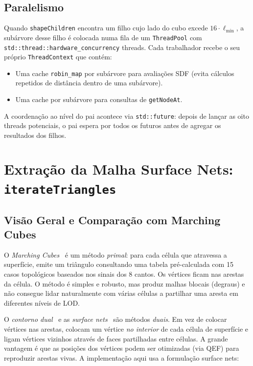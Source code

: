\documentclass[10pt,a4paper]{article}
\begin{document}
\subsection{Paralelismo}

Quando \lstinline{shapeChildren} encontra um filho cujo lado do cubo
excede $16 \cdot \ell_{\min}$, a subárvore desse filho é colocada
numa fila de um \lstinline{ThreadPool} com
\lstinline{std::thread::hardware_concurrency} threads. Cada
trabalhador recebe o seu próprio \lstinline{ThreadContext} que
contém:
\begin{itemize}
  \item Uma cache \lstinline{robin_map} por subárvore para avaliações
    SDF (evita cálculos repetidos de distância dentro de uma
    subárvore).
  \item Uma cache por subárvore para consultas de
    \lstinline{getNodeAt}.
\end{itemize}
A coordenação ao nível do pai acontece via \lstinline{std::future}:
depois de lançar as oito threads potenciais, o pai espera por todos
os futuros antes de agregar os resultados dos filhos.

\section{Extração da Malha Surface Nets: \texttt{iterateTriangles}}
\label{sec:itriangles}

\subsection{Visão Geral e Comparação com Marching Cubes}

O \emph{Marching Cubes}~\cite{lorensen87} é um método
\emph{primal}: para cada célula que atravessa a superfície, emite
um triângulo consultando uma tabela pré-calculada com 15 casos
topológicos baseados nos sinais dos 8 cantos. Os vértices ficam nas
arestas da célula. O método é simples e robusto, mas produz malhas
blocais (degraus) e não consegue lidar naturalmente com várias
células a partilhar uma aresta em diferentes níveis de LOD.

O \emph{contorno dual}~\cite{ju02} e as \emph{surface
nets}~\cite{gibson98} são métodos \emph{duais}. Em vez de colocar
vértices nas arestas, colocam um vértice \emph{no interior} de cada
célula de superfície e ligam vértices vizinhos através de faces
partilhadas entre células. A grande vantagem é que as posições dos
vértices podem ser otimizadas (via QEF) para reproduzir arestas
vivas. A implementação aqui usa a formulação surface nets:
\end{document}
